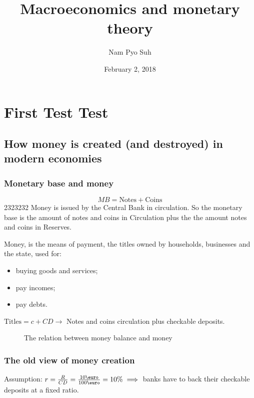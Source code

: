 \documentclass{report}
\title{Macroeconomics and monetary theory}
\author{Nam Pyo Suh}
\date{February 2, 2018}
\begin{document}
\part{First Test Test}
\chapter{How money is created (and destroyed) in modern economies}
\section{Monetary base and money}

$$MB=\text{Notes} + \text{Coins}$$ 2323232 Money is issued by the Central Bank in circulation. So the monetary base is the amount of notes and coins in Circulation plus the the amount notes and coins in Reserves. 

Money, is the means of payment, the titles owned by households, businesses and the state, used for:
\begin{itemize}
    \item buying goods and services; 
    \item pay incomes; 
    \item pay debts.
\end{itemize}

$\text{Titles}=c+CD \longrightarrow $ Notes and coins circulation plus checkable deposits.

\begin{figure}[H]
    \centering
{}
    \caption{The relation between money balance and money}
    \label{fig:my_label}
\end{figure}

\clearpage
\section{The old view of money creation}

Assumption: $r=\frac{R}{CD}=\frac{10\text{\euro}}{100\text{\euro}}=10\% \implies$ banks have to back their checkable deposits at a fixed ratio.
\end{document}
